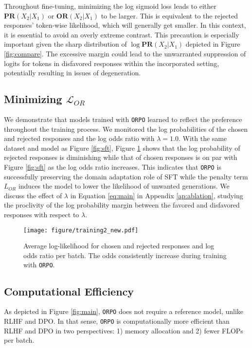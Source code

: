 Throughout fine-tuning, minimizing the log sigmoid loss leads to either $\textbf{PR}(X_2|X_1)$ or $\textbf{OR}(X_2|X_1)$ to be larger. This is equivalent to the rejected responses' token-wise likelihood, which will generally get smaller. In this context, it is essential to avoid an overly extreme contrast. This precaution is especially important given the sharp distribution of $\log \textbf{PR}(X_2|X_1)$ depicted in Figure \ref{fig:compare}. The excessive margin could lead to the unwarranted suppression of logits for tokens in disfavored responses within the incorporated setting, potentially resulting in issues of degeneration.

\subsection{Minimizing $\mathcal{L}_{OR}$}\label{subsec:odds_trend}
We demonstrate that models trained with \texttt{ORPO} learned to reflect the preference throughout the training process. We monitored the log probabilities of the chosen and rejected responses and the log odds ratio with $\lambda = 1.0$. With the same dataset and model as Figure \ref{fig:sft}, Figure \ref{fig:log_odds} shows that the log probability of rejected responses is diminishing while that of chosen responses is on par with Figure \ref{fig:sft} as the log odds ratio increases. This indicates that \texttt{ORPO} is successfully preserving the domain adaptation role of SFT while the penalty term $L_{OR}$ induces the model to lower the likelihood of unwanted generations. We discuss the effect of $\lambda$ in Equation \ref{eq:main} in Appendix \ref{ap:ablation}, studying the proclivity of the log probability margin between the favored and disfavored responses with respect to $\lambda$.
\begin{figure}[hbt!]
    \centering
    \texttt{[image: figure/training2\_new.pdf]}
    \caption{Average log-likelihood for chosen and rejected responses and log odds ratio per batch. The odds consistently increase during training with \texttt{ORPO}.}
    \label{fig:log_odds}
\end{figure}

\subsection{Computational Efficiency}\label{subsec:compute}

As depicted in Figure \ref{fig:main}, \texttt{ORPO} does not require a reference model, unlike RLHF and DPO. In that sense, \texttt{ORPO} is computationally more efficient than RLHF and DPO in two perspectives: 1) memory allocation and 2) fewer FLOPs per batch.

